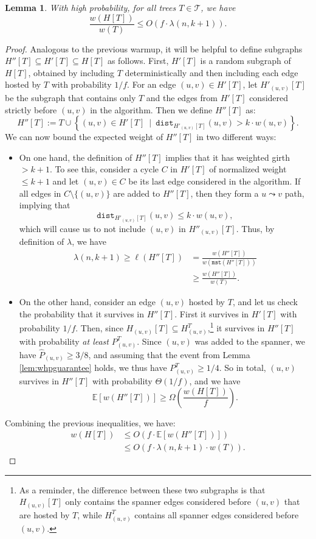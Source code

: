 \documentclass{article}
\theoremstyle{plain}
\newtheorem{lemma}[theorem]{Lemma}
\theoremstyle{definition}
\newcommand{\dist}{\texttt{dist}}
\newcommand{\mst}{\texttt{mst}}
\begin{document}
\begin{lemma} \label{lem:polyhostbound}
With high probability, for all trees $T \in \mathcal{T}$, we have
$$\frac{w(H[T])}{w(T)} \le O\left(f \cdot \lambda(n, k+1)\right).$$
\end{lemma}
\begin{proof}
Analogous to the previous warmup, it will be helpful to define subgraphs $H''[T] \subseteq H'[T] \subseteq H[T]$ as follows.
First, $H'[T]$ is a random subgraph of $H[T]$, obtained by including $T$ deterministically and then including each edge hosted by $T$ with probability $1/f$.
For an edge $(u, v) \in H'[T]$, let $H'_{(u, v)}[T]$ be the subgraph that contains only $T$ and the edges from $H'[T]$ considered strictly before $(u, v)$ in the algorithm.
Then we define $H''[T]$ as:
$$H''[T] := T \cup \left\{ (u, v) \in H'[T] \ \mid \ \dist_{H'_{(u, v)}[T]}(u, v) > k \cdot w(u, v)\right\}.$$
We can now bound the expected weight of $H''[T]$ in two different ways:
\begin{itemize}
\item On one hand, the definition of $H''[T]$ implies that it has weighted girth $>k+1$.
To see this, consider a cycle $C$ in $H'[T]$ of normalized weight $\le k+1$ and let $(u, v) \in C$ be its last edge considered in the algorithm.
If all edges in $C \setminus \{(u, v)\}$ are added to $H''[T]$, then they form a $u \leadsto v$ path, implying that
$$\dist_{H'_{(u, v)}[T]}(u, v) \le k \cdot w(u, v),$$
which will cause us to not include $(u, v)$ in $H''_{(u, v)}[T]$.
Thus, by definition of $\lambda$, we have
\begin{align*}
\lambda(n, k+1) \ge \ell(H''[T]) &= \frac{w(H''[T])}{w(\mst(H''[T]))}\\
&\ge \frac{w(H''[T])}{w(T)}.
\end{align*}

\item On the other hand, consider an edge $(u, v)$ hosted by $T$, and let us check the probability that it survives in $H''[T]$.
First it survives in $H'[T]$ with probability $1/f$.
Then, since $H_{(u, v)}[T] \subseteq H_{(u, v)}^T$,\footnote{As a reminder, the difference between these two subgraphs is that $H_{(u, v)}[T]$ only contains the spanner edges considered before $(u, v)$ that are hosted by $T$, while $H_{(u, v)}^T$ contains all spanner edges considered before $(u, v)$.} it survives in $H''[T]$ with probability \emph{at least} $P_{(u, v)}^T$.
Since $(u, v)$ was added to the spanner, we have $\widehat{P}_{(u, v)} \ge 3/8$, and assuming that the event from Lemma \ref{lem:whpguarantee} holds, we thus have $P_{(u, v)}^T \ge 1/4$.
So in total, $(u, v)$ survives in $H''[T]$ with probability $\Theta(1/f)$, and we have
$$\mathbb{E}\left[w(H''[T])\right] \ge \Omega\left(\frac{w(H[T])}{f} \right).$$
\end{itemize}

Combining the previous inequalities, we have:
\begin{align*}
w(H[T]) &\le O\left(f \cdot \mathbb{E}\left[w(H''[T])\right]\right)\\
&\le O\left(f \cdot \lambda(n, k+1) \cdot w(T)\right). \tag*{\qedhere}
\end{align*}
\end{proof}
\end{document}
